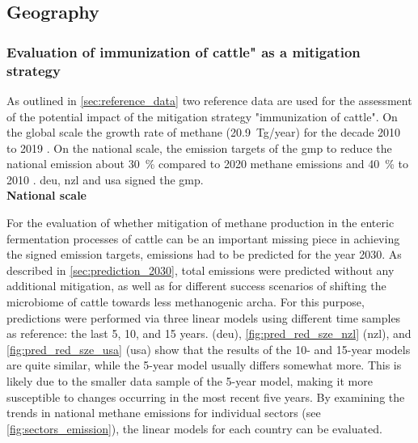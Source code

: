 








\subsection{Geography}

\subsubsection{Evaluation of immunization of cattle" as a mitigation strategy}
\label{sec:discuss_eval_immun}

As outlined in \cref{sec:reference_data} two reference data are used for the assessment of the potential impact of the mitigation strategy "immunization of cattle". On the global scale the growth rate of methane (20.9~Tg/year) for the decade 2010 to 2019 \parencite{saunoisGlobalMethaneBudget2025}. On the national scale, the emission targets of the \acrfull{gmp} to reduce the national emission about 30~\% compared to 2020 methane emissions and 40~\% to 2010 \parencite{appelhansUnterschatztesTreibhausgasMethan2025}. \acrshort{deu}, \acrshort{nzl} and \acrshort{usa} signed the \acrshort{gmp}.\\

\textbf{National scale}

\noindent For the evaluation of whether mitigation of methane production in the enteric fermentation processes of cattle can be an important missing piece in achieving the signed emission targets,  emissions had to be predicted for the year 2030. As described in \cref{sec:prediction_2030}, total emissions were predicted without any additional mitigation, as well as for different success scenarios of shifting the microbiome of cattle towards less methanogenic \gls{archa}. For this purpose, predictions were performed via three linear models using different time samples as reference: the last 5, 10, and 15 years.
 (\acrshort{deu}), \ref{fig:pred_red_sze_nzl} (\acrshort{nzl}), and \ref{fig:pred_red_sze_usa} (\acrshort{usa}) show that the results of the 10- and 15-year models are quite similar, while the 5-year model usually differs somewhat more. This is likely due to the smaller data sample of the 5-year model, making it more susceptible to changes occurring in the most recent five years.
By examining the trends in national methane emissions for individual sectors (see \cref{fig:sectors_emission}), the linear models for each country can be evaluated.


